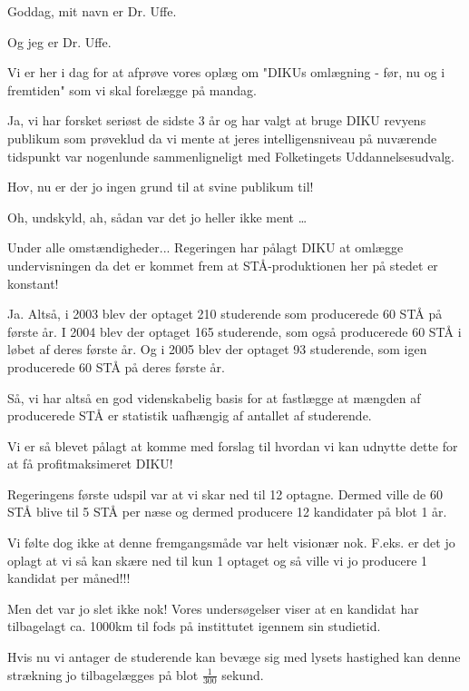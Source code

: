 \documentclass[a4paper,11pt]{article}
\begin{document}
  
\begin{sketch}
 Goddag, mit navn er Dr. Uffe.

 Og jeg er Dr. Uffe.

 Vi er her i dag for at afprøve vores oplæg om "DIKUs omlægning -
før, nu og i fremtiden" som vi skal forelægge på mandag.

 Ja, vi har forsket seriøst de sidste 3 år og har valgt at bruge
DIKU revyens publikum som prøveklud da vi mente at jeres
intelligensniveau på nuværende tidspunkt var nogenlunde
sammenligneligt med Folketingets Uddannelsesudvalg.

 Hov, nu er der jo ingen grund til at svine publikum til!

 Oh, undskyld, ah, sådan var det jo heller ikke ment \dots

 Under alle omstændigheder... Regeringen har pålagt DIKU at omlægge
undervisningen da det er kommet frem at STÅ-produktionen her på stedet
er konstant!

 Ja. Altså, i 2003 blev der optaget 210 studerende som producerede
60 STÅ på første år. I 2004 blev der optaget 165 studerende, som også
producerede 60 STÅ i løbet af deres første år. Og i 2005 blev der
optaget 93 studerende, som igen producerede 60 STÅ på deres første år.

 Så, vi har altså en god videnskabelig basis for at fastlægge at
mængden af producerede STÅ er statistik uafhængig af antallet af
studerende.

 Vi er så blevet pålagt at komme med forslag til hvordan vi kan
udnytte dette for at få profitmaksimeret DIKU!

 Regeringens første udspil var at vi skar ned til 12 optagne. Dermed
ville de 60 STÅ blive til 5 STÅ per næse og dermed producere 12
kandidater på blot 1 år.

 Vi følte dog ikke at denne fremgangsmåde var helt visionær nok.
F.eks. er det jo oplagt at vi så kan skære ned til kun 1 optaget og så
ville vi jo producere 1 kandidat per måned!!!

 Men det var jo slet ikke nok! Vores undersøgelser viser at en
kandidat har tilbagelagt ca. 1000km til fods på instittutet igennem
sin studietid.

 Hvis nu vi antager de studerende kan bevæge sig med lysets
hastighed kan denne strækning jo tilbagelægges på blot $\frac{1}{300}$ sekund.


\end{sketch}
\end{document}
